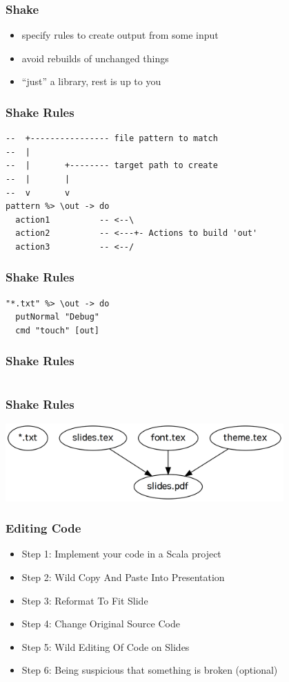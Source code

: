 \documentclass{beamer}
\begin{document}
\begin{frame}
  \frametitle{Shake}
  \begin{itemize}
  \item specify rules to create output from some input
  \item avoid rebuilds of unchanged things
  \item ``just'' a library, rest is up to you
  \end{itemize}
\end{frame}

\begin{frame}[fragile]
  \frametitle{Shake Rules}
  \begin{verbatim}
--  +---------------- file pattern to match
--  |
--  |       +-------- target path to create
--  |       |
--  v       v
pattern %> \out -> do
  action1          -- <--\
  action2          -- <---+- Actions to build 'out'
  action3          -- <--/
  \end{verbatim}
\end{frame}

\begin{frame}[fragile]
  \frametitle{Shake Rules}
  \begin{verbatim}
"*.txt" %> \out -> do
  putNormal "Debug"
  cmd "touch" [out]
  \end{verbatim}
\end{frame}

\begin{frame}[fragile]
  \frametitle{Shake Rules}
  \inputminted[autogobble]{haskell}{snippets/pdf-rule.hs}
\end{frame}

\begin{frame}
  \frametitle{Shake Rules}
  \begin{center}
    \includegraphics[width=0.8\textwidth]{graphviz/rules.png}
  \end{center}
\end{frame}

\begin{frame}
  \frametitle{Editing Code}
  \begin{itemize}
  \item Step 1: Implement your code in a Scala project
  \item Step 2: Wild Copy And Paste Into Presentation
  \item Step 3: Reformat To Fit Slide
  \item Step 4: Change Original Source Code
  \item Step 5: Wild Editing Of Code on Slides
  \item Step 6: Being suspicious that something is broken (optional)
  \end{itemize}
\end{frame}
\end{document}
